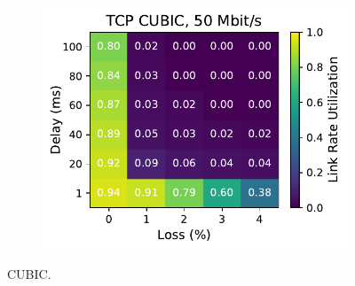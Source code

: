 \begin{figure}[ht]
\begin{subfigure}[b]{0.89cm}
        \includegraphics[width=\linewidth,trim={8cm 0 0 0},clip]{splitting-paper/figures/heatmaps/heatmap_tcp_cubic_50mbps.pdf}
        \vspace*{0.2cm}
    \end{subfigure}
    \caption{CUBIC.}
\end{figure}


